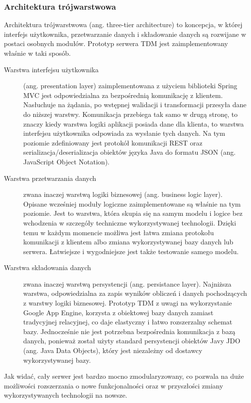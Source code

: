 \subsubsection{Architektura trójwarstwowa}
Architektura trójwarstwowa (ang. three-tier architecture) to koncepcja, w której
interfejs użytkownika, przetwarzanie danych i składowanie danych są rozwijane w
postaci osobnych modułów. Prototyp serwera TDM jest zaimplementowany właśnie w
taki sposób.

\begin{description}
  \item[Warstwa interfejsu użytkownika] (ang. presentation
  layer) zaimplementowana z użyciem biblioteki Spring MVC jest odpowiedzialna za
  bezpośrednią komunikację z klientem.
  Nasłuchuje na żądania, po wstępnej walidacji i transformacji przesyła dane do
  niższej warstwy. Komunikacja przebiega tak samo w drugą stronę, to znaczy
  kiedy warstwa logiki aplikacji posiada dane dla klienta, to warstwa interfejsu
  użytkownika odpowiada za wysłanie tych danych. Na tym poziomie zdefiniowany
  jest protokół komunikacji REST oraz serializacja/deserializacja obiektów
  języka Java do formatu JSON (ang. JavaScript Object Notation).
  
  \item[Warstwa przetwarzania danych] zwana inaczej warstwą logiki biznesowej
  (ang. business logic layer). Opisane wcześniej moduły logiczne
  zaimplementowane są właśnie na tym poziomie. Jest to warstwa, która skupia się
  na samym modelu i logice bez wchodzenia w szczegóły techniczne wykorzystywanej
  technologii. Dzięki temu w każdym momencie możliwa jest łatwa zmiana protokołu
  komunikacji z klientem albo zmiana wykorzystywanej bazy danych lub serwera.
  Łatwiejsze i wygodniejsze jest także testowanie samego modelu.
  
  \item[Warstwa składowania danych] zwana inaczej warstwą persystencji (ang.
  persistance layer). Najniższa warstwa, odpowiedzialna za zapis wyników
  obliczeń i danych pochodzących z warstwy logiki biznesowej. Prototyp TDM z
  uwagi na wykorzystanie Google App Engine, korzysta z obiektowej bazy danych
  zamiast tradycyjnej relacyjnej, co daje elastyczny i łatwo rozszerzalny
  schemat bazy. Jednocześnie nie jest potrzebna bezpośrednia komunikacja z bazą
  danych, ponieważ został użyty standard persystencji obiektów Javy JDO (ang.
  Java Data Objects), który jest niezależny od dostawcy wykorzystywanej bazy.
\end{description}
Jak widać, cały serwer jest bardzo mocno zmodularyzowany, co pozwala na duże
możliwości rozszerzania o nowe funkcjonalności oraz w przyszłości zmiany
wykorzystywanych technologii na nowsze.

